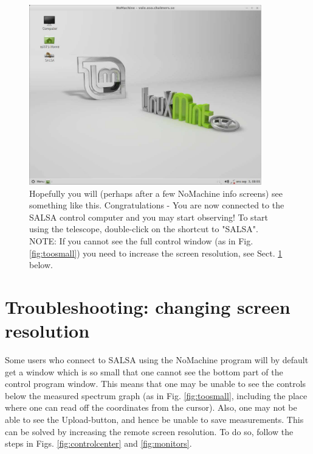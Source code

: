 \begin{figure}[H]
    \centering
	\includegraphics[width=0.9\textwidth]{../figures/nomachinefigs/fig9-connected.pdf}
    \caption{Hopefully you will (perhaps after a few NoMachine info screens)
see something like this. Congratulations - You are now connected to the SALSA
control computer and you may start observing! 
To start using the telescope, double-click on the shortcut to "SALSA".
NOTE: If you cannot see the full control window (as in Fig. \ref{fig:toosmall})
you need to increase the screen resolution, see Sect. \ref{sect:screenres}
below.
} 
\label{fig:connected} 
\end{figure}

\section{Troubleshooting: changing screen resolution}
\label{sect:screenres}
Some users who connect to SALSA using the NoMachine program will by default get
a window which is so small that one cannot see the bottom part of the control
program window. This means that one may be unable to see the controls below the
measured spectrum graph (as in Fig. \ref{fig:toosmall}, including the place
where one can read off the coordinates from the cursor). Also, one may not be
able to see the Upload-button, and hence be unable to save measurements.  This
can be solved by increasing the remote screen resolution. To do so, follow the
steps in Figs. \ref{fig:controlcenter} and \ref{fig:monitors}.

